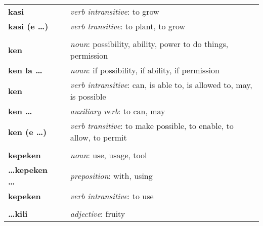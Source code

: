 \begin{supertabular}{p{2,5cm}|ll}
    \textbf{kasi}                &  & \textit{verb intransitive}: to grow                                                                        \\
    \textbf{kasi (e \dots)}      &  & \textit{verb transitive}: to plant, to grow                                                                \\
                                 &  &                                                                                                            \\
    \textbf{ken}                 &  & \textit{noun}: possibility, ability, power to do things, permission                                        \\
    \textbf{ken la \dots}        &  & \textit{noun}: if possibility, if ability, if permission                                                   \\
    \textbf{ken}                 &  & \textit{verb intransitive}: can, is able to, is allowed to, may, is possible                               \\
    \textbf{ken \dots}           &  & \textit{auxiliary verb}: to can, may                                                                       \\
    \textbf{ken (e \dots)}       &  & \textit{verb transitive}: to make possible, to enable, to allow, to permit                                 \\
                                 &  &                                                                                                            \\
    \textbf{kepeken}             &  & \textit{noun}: use, usage, tool                                                                            \\
    \textbf{\dots kepeken \dots} &  & \textit{preposition}: with, using                                                                          \\
    \textbf{kepeken}             &  & \textit{verb intransitive}: to use                                                                         \\
                                 &  &                                                                                                            \\
    \textbf{\dots kili}          &  & \textit{adjective}: fruity                                                                                 \\

\end{supertabular}
